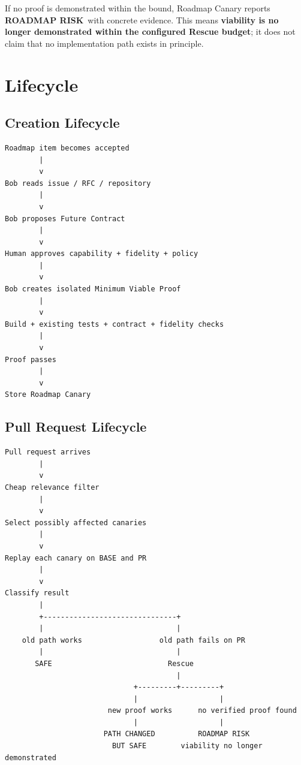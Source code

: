 \documentclass[12pt]{article}
\newcommand{\statusrisk}{\textbf{\color{red}ROADMAP RISK}}
\begin{document}
If no proof is demonstrated within the bound, Roadmap Canary reports \statusrisk\ with concrete evidence. This means \textbf{viability is no longer demonstrated within the configured Rescue budget}; it does not claim that no implementation path exists in principle.

\section{Lifecycle}

\subsection{Creation Lifecycle}

\begin{lstlisting}
Roadmap item becomes accepted
        |
        v
Bob reads issue / RFC / repository
        |
        v
Bob proposes Future Contract
        |
        v
Human approves capability + fidelity + policy
        |
        v
Bob creates isolated Minimum Viable Proof
        |
        v
Build + existing tests + contract + fidelity checks
        |
        v
Proof passes
        |
        v
Store Roadmap Canary
\end{lstlisting}

\subsection{Pull Request Lifecycle}

\begin{lstlisting}
Pull request arrives
        |
        v
Cheap relevance filter
        |
        v
Select possibly affected canaries
        |
        v
Replay each canary on BASE and PR
        |
        v
Classify result
        |
        +-------------------------------+
        |                               |
    old path works                  old path fails on PR
        |                               |
       SAFE                           Rescue
                                        |
                              +---------+---------+
                              |                   |
                        new proof works      no verified proof found
                              |                   |
                       PATH CHANGED          ROADMAP RISK
                         BUT SAFE        viability no longer demonstrated
\end{lstlisting}
\end{document}
